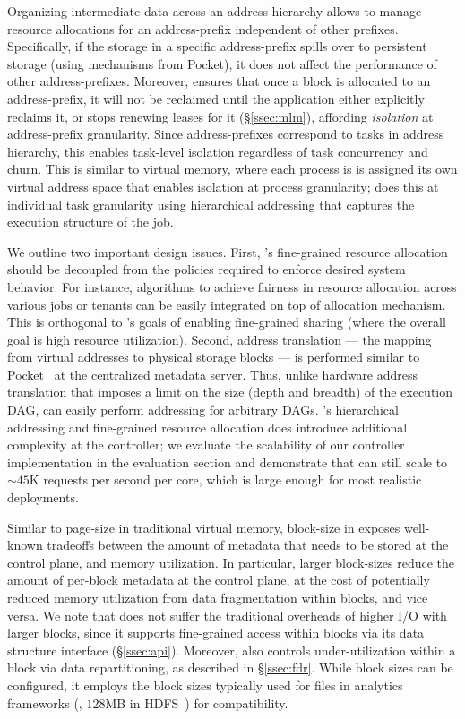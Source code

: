 Organizing intermediate data across an address hierarchy allows \jiffy to manage resource allocations for an address-prefix independent of other prefixes. Specifically, if the storage in a specific address-prefix spills over to persistent storage (using mechanisms from Pocket), it does not affect the performance of other address-prefixes. Moreover, \jiffy ensures that once a block is allocated to an address-prefix, it will not be reclaimed until the application either explicitly reclaims it, or stops renewing leases for it (\S\ref{ssec:mlm}), affording \textit{isolation} at address-prefix granularity. Since address-prefixes correspond to tasks in \jiffy address hierarchy, this enables task-level isolation regardless of task concurrency and churn. This is similar to virtual memory, where each process is is assigned its own virtual address space that enables isolation at process granularity; \jiffy does this at individual task granularity using hierarchical addressing that captures the execution structure of the job. 

We outline two important design issues. First, \jiffy's fine-grained resource allocation should be decoupled from the policies required to enforce desired system behavior. For instance, algorithms to achieve fairness in resource allocation across various jobs or tenants can be easily integrated on top of \jiffy allocation mechanism. This is orthogonal to \jiffy's goals of enabling fine-grained sharing (where the overall goal is high resource utilization). Second, address translation --- the mapping from virtual addresses to physical storage blocks --- is performed similar to Pocket~\cite{pocket} at the centralized metadata server. Thus, unlike hardware address translation that imposes a limit on the size (depth and breadth) of the execution DAG, \jiffy can easily perform addressing for arbitrary DAGs. \jiffy's hierarchical addressing and fine-grained resource allocation does introduce additional complexity at the controller; we evaluate the scalability of our controller implementation in the evaluation section and demonstrate that \jiffy can still scale to ${\sim}45$K requests per second per core, which is large enough for most realistic deployments. 


 Similar to page-size in traditional virtual memory, block-size in \jiffy exposes well-known tradeoffs between the amount of metadata that needs to be stored at the control plane, and memory utilization. In particular, larger block-sizes reduce the amount of per-block metadata at the control plane, at the cost of potentially reduced memory utilization from data fragmentation within blocks, and vice versa. We note that \jiffy does not suffer the traditional overheads of higher I/O with larger blocks, since it supports fine-grained access within blocks via its data structure interface (\S\ref{ssec:api}). Moreover, \jiffy also controls under-utilization within a block via data repartitioning, as described in \S\ref{ssec:fdr}. While \jiffy block sizes can be configured, it employs the block sizes typically used for files in analytics frameworks (\eg, $128$MB in HDFS~\cite{hdfs}) for compatibility.

